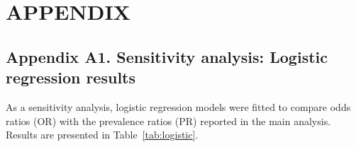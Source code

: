 \chapter*{APPENDIX}
{}

\section*{Appendix A1. Sensitivity analysis: Logistic regression results}

As a sensitivity analysis, logistic regression models were fitted to compare odds ratios (OR) with the prevalence ratios (PR) reported in the main analysis. Results are presented in Table~\ref{tab:logistic}.

